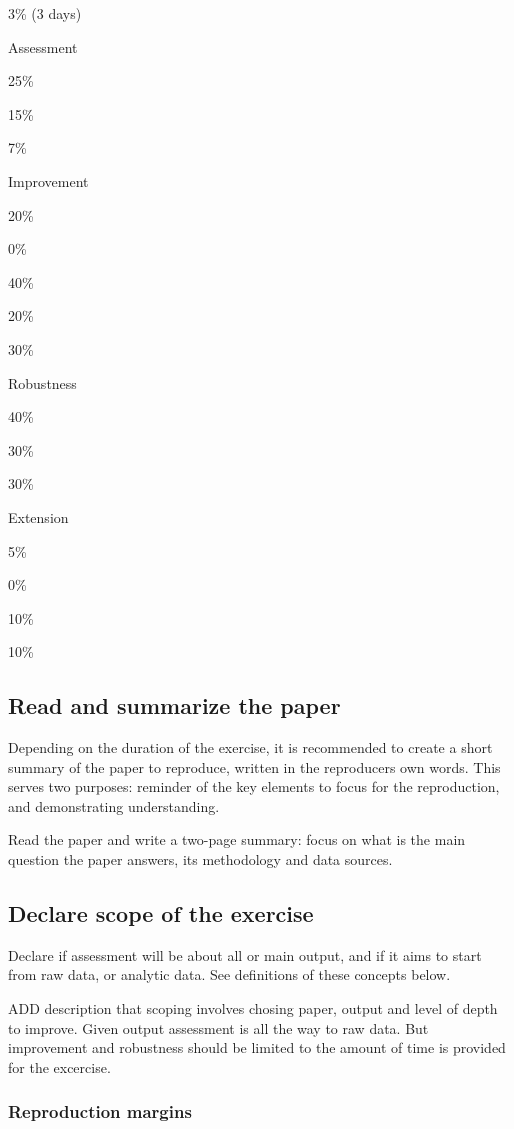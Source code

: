 \documentclass[]{book}
\begin{document}
3\% (3 days)

Assessment

25\%

15\%

7\%

Improvement

20\%

0\%

40\%

20\%

30\%

Robustness

40\%

30\%

30\%

Extension

5\%

0\%

10\%

10\%

\hypertarget{read-sum}{%
\subsection{Read and summarize the paper}\label{read-sum}}

Depending on the duration of the exercise, it is recommended to create a short summary of the paper to reproduce, written in the reproducers own words. This serves two purposes: reminder of the key elements to focus for the reproduction, and demonstrating understanding.

Read the paper and write a two-page summary: focus on what is the main question the paper answers, its methodology and data sources.

\hypertarget{declare-scope-of-the-exercise}{%
\subsection{Declare scope of the exercise}\label{declare-scope-of-the-exercise}}

Declare if assessment will be about all or main output, and if it aims to start from raw data, or analytic data. See definitions of these concepts below.

ADD description that scoping involves chosing paper, output and level of depth to improve. Given output assessment is all the way to raw data. But improvement and robustness should be limited to the amount of time is provided for the excercise.

\hypertarget{reproduction-margins}{%
\subsubsection{Reproduction margins}\label{reproduction-margins}}
\end{document}
